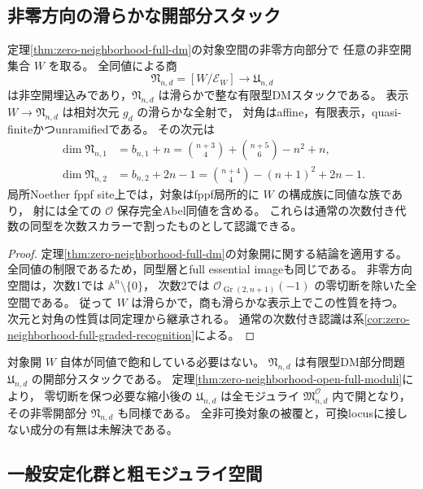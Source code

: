 \subsection{非零方向の滑らかな開部分スタック}

\begin{corollary}[全同値による一般非可換部分のDMモジュライ]
\label{thm:generic-full-dm-stack}
定理\ref{thm:zero-neighborhood-full-dm}の対象空間の非零方向部分で
任意の非空開集合 $W$ を取る。
全同値による商
\[
             \mathfrak N_{n,d}=[W/\mathcal E_W]
                 \longrightarrow\mathfrak U_{n,d}
\]
は非空開埋込みであり，$\mathfrak N_{n,d}$ は滑らかで整な有限型DMスタックである。
表示 $W\to\mathfrak N_{n,d}$ は相対次元 $g_d$ の滑らかな全射で，
対角はaffine，有限表示，quasi-finiteかつunramifiedである。
その次元は
\begin{align*}
 \dim\mathfrak N_{n,1}
   &=b_{n,1}+n=\binom{n+3}{4}+\binom{n+5}{6}-n^2+n,\\
 \dim\mathfrak N_{n,2}
   &=b_{n,2}+2n-1=\binom{n+4}{4}-(n+1)^2+2n-1.
\end{align*}
局所Noether fppf site上では，対象はfppf局所的に $W$ の構成族に同値な族であり，
射には全ての $\mathcal O$ 保存完全Abel同値を含める。
これらは通常の次数付き代数の同型を次数スカラーで割ったものとして認識できる。
\end{corollary}
\begin{proof}
定理\ref{thm:zero-neighborhood-full-dm}の対象開に関する結論を適用する。
全同値の制限であるため，同型層とfull essential imageも同じである。
非零方向空間は，次数1では $\mathbb A^n\setminus\{0\}$，
次数2では $\mathcal O_{\operatorname{Gr}(2,n+1)}(-1)$ の零切断を除いた全空間である。
従って $W$ は滑らかで，商も滑らかな表示上でこの性質を持つ。
次元と対角の性質は同定理から継承される。
通常の次数付き認識は系\ref{cor:zero-neighborhood-full-graded-recognition}による。
\end{proof}

\begin{remark}[部分問題の範囲]\label{rem:generic-dm-scope}
対象開 $W$ 自体が同値で飽和している必要はない。
$\mathfrak N_{n,d}$ は有限型DM部分問題 $\mathfrak U_{n,d}$ の開部分スタックである。
定理\ref{thm:zero-neighborhood-open-full-moduli}により，
零切断を保つ必要な縮小後の $\mathfrak U_{n,d}$ は全モジュライ
$\mathfrak M^{\mathcal O}_{n,d}$ 内で開となり，
その非零開部分 $\mathfrak N_{n,d}$ も同様である。
全非可換対象の被覆と，可換locusに接しない成分の有無は未解決である。
\end{remark}

\subsection{一般安定化群と粗モジュライ空間}

